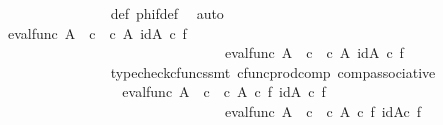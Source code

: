 \begin{isabellebody}
\ \ \ \ \ \ \ \ \ \ \ \ \ \ \ \ \isamarkupfalse%
\ {\isasymphi}{\isacharunderscore}{\kern0pt}def\ phi{\isacharunderscore}{\kern0pt}f{\isacharunderscore}{\kern0pt}def\ \isamarkupfalse%
\ auto\isanewline
\ \ \ \ \ \ \ \ \ \ \ \ \ \ \isamarkupfalse%
\ \isamarkupfalse%
\ {\isachardoublequoteopen}{\isachardot}{\kern0pt}{\isachardot}{\kern0pt}{\isachardot}{\kern0pt}\ {\isacharequal}{\kern0pt}\ {\isasymlangle}eval{\isacharunderscore}{\kern0pt}func\ A\ {\isasymOmega}\ {\isasymcirc}\isactrlsub c\ {\isasymlangle}{\isasymt}\ {\isasymcirc}\isactrlsub c\ {\isasymbeta}\isactrlbsub A\isactrlbsup {\isasymOmega}\isactrlesup \isactrlesub {\isacharcomma}{\kern0pt}\ id{\isacharparenleft}{\kern0pt}A\isactrlbsup {\isasymOmega}\isactrlesup {\isacharparenright}{\kern0pt}{\isasymrangle}\ {\isasymcirc}\isactrlsub c\ f{\isacharcomma}{\kern0pt}\isanewline
\ \ \ \ \ \ \ \ \ \ \ \ \ \ \ \ \ \ \ \ \ \ \ \ \ \ \ \ \ \ \ \ \ \ eval{\isacharunderscore}{\kern0pt}func\ A\ {\isasymOmega}\ {\isasymcirc}\isactrlsub c\ {\isasymlangle}{\isasymf}\ {\isasymcirc}\isactrlsub c\ {\isasymbeta}\isactrlbsub A\isactrlbsup {\isasymOmega}\isactrlesup \isactrlesub {\isacharcomma}{\kern0pt}\ id{\isacharparenleft}{\kern0pt}A\isactrlbsup {\isasymOmega}\isactrlesup {\isacharparenright}{\kern0pt}{\isasymrangle}\ {\isasymcirc}\isactrlsub c\ f{\isasymrangle}{\isachardoublequoteclose}\isanewline
\ \ \ \ \ \ \ \ \ \ \ \ \ \ \ \ \isamarkupfalse%
\ {\isacharparenleft}{\kern0pt}typecheck{\isacharunderscore}{\kern0pt}cfuncs{\isacharcomma}{\kern0pt}smt\ cfunc{\isacharunderscore}{\kern0pt}prod{\isacharunderscore}{\kern0pt}comp\ comp{\isacharunderscore}{\kern0pt}associative{}{\isacharparenright}{\kern0pt}\isanewline
\ \ \ \ \ \ \ \ \ \ \ \ \ \ \isamarkupfalse%
\ \isamarkupfalse%
\ {\isachardoublequoteopen}{\isachardot}{\kern0pt}{\isachardot}{\kern0pt}{\isachardot}{\kern0pt}\ {\isacharequal}{\kern0pt}\ {\isasymlangle}eval{\isacharunderscore}{\kern0pt}func\ A\ {\isasymOmega}\ {\isasymcirc}\isactrlsub c\ {\isasymlangle}{\isasymt}\ {\isasymcirc}\isactrlsub c\ {\isasymbeta}\isactrlbsub A\isactrlbsup {\isasymOmega}\isactrlesup \isactrlesub \ {\isasymcirc}\isactrlsub c\ f{\isacharcomma}{\kern0pt}\ id{\isacharparenleft}{\kern0pt}A\isactrlbsup {\isasymOmega}\isactrlesup {\isacharparenright}{\kern0pt}\ {\isasymcirc}\isactrlsub c\ f{\isasymrangle}{\isacharcomma}{\kern0pt}\isanewline
\ \ \ \ \ \ \ \ \ \ \ \ \ \ \ \ \ \ \ \ \ \ \ \ \ \ \ \ \ \ \ \ \ \ eval{\isacharunderscore}{\kern0pt}func\ A\ {\isasymOmega}\ {\isasymcirc}\isactrlsub c\ {\isasymlangle}{\isasymf}\ {\isasymcirc}\isactrlsub c\ {\isasymbeta}\isactrlbsub A\isactrlbsup {\isasymOmega}\isactrlesup \isactrlesub \ {\isasymcirc}\isactrlsub c\ f{\isacharcomma}{\kern0pt}\ id{\isacharparenleft}{\kern0pt}A\isactrlbsup {\isasymOmega}\isactrlesup {\isacharparenright}{\kern0pt}{\isasymcirc}\isactrlsub c\ f{\isasymrangle}{\isasymrangle}{\isachardoublequoteclose}\isanewline

\end{isabellebody}
